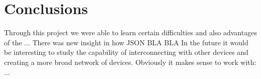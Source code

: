 \documentclass{article}
\begin{document}
\newpage

\section{Conclusions}
Through this project we were able to learn certain difficulties and also
advantages of the ... There was new insight in how JSON BLA BLA In the future it
would be interesting to study the capability of interconnecting with other
devices and creating a more broad network of devices. Obviously it makes sense
to work with: ...

\end{document}

